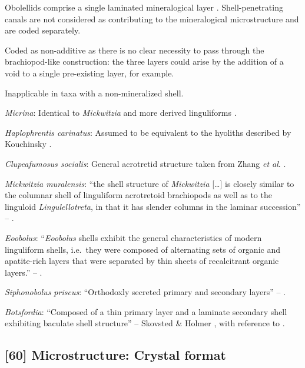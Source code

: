 \documentclass[]{book}
\theoremstyle{definition}
\theoremstyle{definition}
\theoremstyle{definition}
\theoremstyle{remark}
\begin{document}
Obolellids comprise a single laminated mineralogical layer
\citep{Balthasar2008iMummpikia}. Shell-penetrating canals are not
considered as contributing to the mineralogical microstructure and are
coded separately.

Coded as non-additive as there is no clear necessity to pass through the
brachiopod-like construction: the three layers could arise by the
addition of a void to a single pre-existing layer, for example.

Inapplicable in taxa with a non-mineralized shell.

\emph{Micrina}: Identical to \emph{Mickwitzia} and more derived
linguliforms \citep{Holmer2011Firstrecord}.

\emph{Haplophrentis carinatus}: Assumed to be equivalent to the hyoliths
described by Kouchinsky
\citeyearpar{Kouchinsky2000Skeletalmicrostructures}.

\emph{Clupeafumosus socialis}: General acrotretid structure taken from
Zhang \emph{et al}. \citeyearpar{Zhang2016Epithelialcell}.

\emph{Mickwitzia muralensis}: ``the shell structure of \emph{Mickwitzia}
{[}\ldots{}{]} is closely similar to the columnar shell of linguliform
acrotretoid brachiopods as well as to the linguloid
\emph{Lingulellotreta}, in that it has slender columns in the laminar
succession'' -- \citet{Williams2007PartH}.

\emph{Eoobolus}: ``\emph{Eoobolus} shells exhibit the general
characteristics of modern linguliform shells, i.e.~they were composed of
alternating sets of organic and apatite-rich layers that were separated
by thin sheets of recalcitrant organic layers.'' --
\citet{Balthasar2007Anearly}.

\emph{Siphonobolus priscus}: ``Orthodoxly secreted primary and secondary
layers'' -- \citet{Williams2004Chemicostructure}.

\emph{Botsfordia}: ``Composed of a thin primary layer and a laminate
secondary shell exhibiting baculate shell structure'' -- Skovsted \&
Holmer \citeyearpar{Skovsted2005EarlyCambrian}, with reference to
\citet{Skovsted2003EarlyCambrian}.

\hypertarget{microstructure-crystal-format}{%
\subsection*{{[}60{]} Microstructure: Crystal
format}\label{microstructure-crystal-format}}
\end{document}
